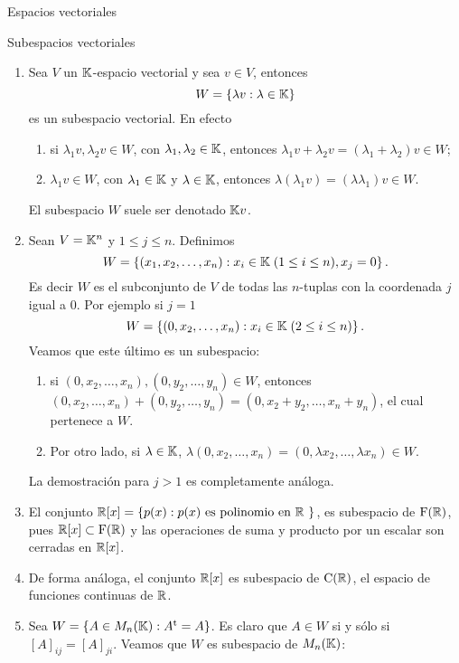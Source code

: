\begin{chapter}{Espacios vectoriales}
\begin{section}{Subespacios vectoriales}
\begin{ejemplo*}
\begin{enumerate}
        \item Sea $V$ un $\mathbb K$-espacio vectorial y sea $v \in V$, entonces
        $$
        W = \{\lambda v: \lambda \in \mathbb K \}
        $$
        es un subespacio vectorial. En  efecto
        \begin{enumerate}
            \item si $\lambda_1v,\lambda_2v \in W$, con $\lambda_1,\lambda_2 \in \mathbb K$,  entonces $\lambda_1v + \lambda_2v = (\lambda_1+\lambda_2)v \in W$;
            \item  $\lambda_1v \in W$, con $\lambda_1 \in \mathbb K$ y $\lambda \in \mathbb K$,  entonces $\lambda(\lambda_1v) = (\lambda \lambda_1)v \in W$.
        \end{enumerate}
        El subespacio $W$ suele ser denotado $\mathbb K v$.
    
        
        \item Sean $V=\mathbb K^n$ y $1\le j \le n$. Definimos 
        $$
        W = \left\{ (x_1,x_2,\ldots,x_n): x_i \in \mathbb K\; (1 \le i \le n), x_j =0\right\}.
        $$
        Es decir $W$  es el subconjunto de $V$ de todas las $n$-tuplas con la coordenada $j$ igual a 0. Por ejemplo  si $j=1$ 
        $$
        W = \left\{ (0,x_2,\ldots,x_n): x_i \in \mathbb K \;(2 \le i \le n)\right\}.
        $$
        Veamos que este último es un subespacio: 
        \begin{enumerate}
            \item si $(0,x_2,\ldots,x_n), (0,y_2,\ldots,y_n) \in W$,  entonces
            $(0,x_2,\ldots,x_n)+ (0,y_2,\ldots,y_n) = (0,x_2+y_2,\ldots,x_n+y_n)$, el cual pertenece a $W$. 
            \item 	Por otro lado, si $\lambda \in \mathbb K$, $\lambda(0,x_2,\ldots,x_n) = (0,\lambda x_2,\ldots,\lambda x_n) \in W$.
        \end{enumerate}
        La demostración para $j >1$ es completamente análoga. 
        \item El  conjunto $\mathbb R[x] = \left\{p(x): p(x) \text{ es polinomio en $\mathbb R$ } \right\}$, es subespacio de $\operatorname{F}(\mathbb R)$, pues $\mathbb R[x] \subset \operatorname{F}(\mathbb R)$ y las operaciones de suma y producto por un escalar son cerradas en $\mathbb R[x]$.
        \item De forma análoga, el conjunto $\mathbb R[x]$ es subespacio de $\operatorname{C}(\mathbb R)$,  el espacio de funciones continuas de  $\mathbb R$.
        \item Sea $W= \left\{A \in M_n(\mathbb K): A^{\operatorname{t}} = A \right\}$. Es claro que  $A \in W$ si y sólo si $[A]_{ij} = [A]_{ji}$. Veamos que  $W$ es subespacio de $M_n(\mathbb K)$: 
        \begin{enumerate}

\end{enumerate}
\end{enumerate}
\end{ejemplo*}
\end{section}
\end{chapter}
